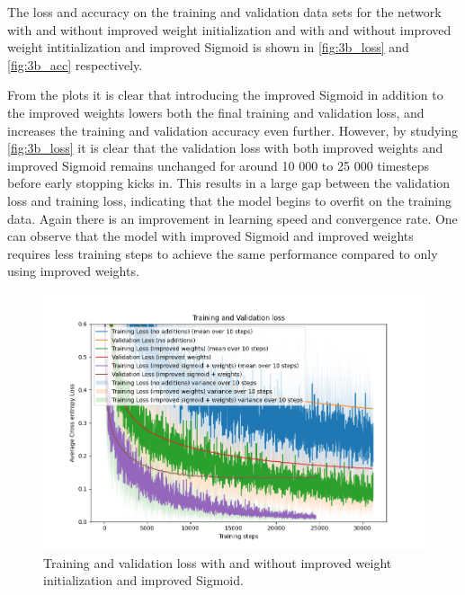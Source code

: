 \documentclass{article}
\begin{document}
The loss and accuracy on the training and validation data sets for the network with and without improved weight initialization and with and without improved weight intitialization and improved Sigmoid is shown in \autoref{fig:3b_loss} and \autoref{fig:3b_acc} respectively. 

From the plots it is clear that introducing the improved Sigmoid in addition to the improved weights lowers both the final training and validation loss, and increases the training and validation accuracy even further. However, by studying \autoref{fig:3b_loss} it is clear that the validation loss with both improved weights and improved Sigmoid remains unchanged for around 10 000 to 25 000 timesteps before early stopping kicks in. This results in a large gap between the validation loss and training loss, indicating that the model begins to overfit on the training data. Again there is an improvement in learning speed and convergence rate. One can observe that the model with improved Sigmoid and improved weights requires less training steps to achieve the same performance compared to only using improved weights.

\begin{figure}[H]
    \centering
    \includegraphics[width=\textwidth]{Assignments/Assignment_2/plots/task3/3b_loss.png}
    \caption{Training and validation loss with and without improved weight initialization and improved Sigmoid.}
    \label{fig:3b_loss}
\end{figure}
\end{document}
